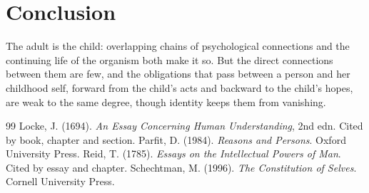 \documentclass{situationist-preprint}
\begin{document}
\section{Conclusion}

The adult is the child: overlapping chains of psychological connections and the continuing life of the organism both make it so. But the direct connections between them are few, and the obligations that pass between a person and her childhood self, forward from the child's acts and backward to the child's hopes, are weak to the same degree, though identity keeps them from vanishing.

\begin{thebibliography}{99}\small
{} Locke, J. (1694). \emph{An Essay Concerning Human Understanding}, 2nd edn. Cited by book, chapter and section.
 Parfit, D. (1984). \emph{Reasons and Persons}. Oxford University Press.
 Reid, T. (1785). \emph{Essays on the Intellectual Powers of Man}. Cited by essay and chapter.
 Schechtman, M. (1996). \emph{The Constitution of Selves}. Cornell University Press.
\end{thebibliography}
\end{document}
